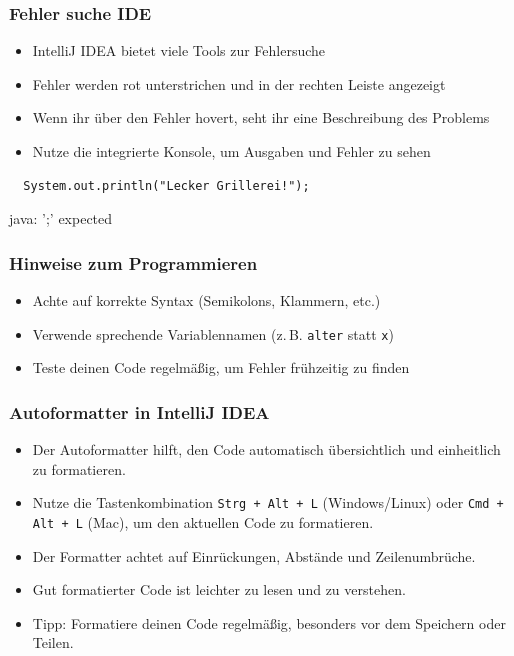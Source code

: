 \documentclass{../../presentation}
\begin{document}
\begin{frame}[fragile]
  \frametitle{Fehler suche IDE}
  \begin{itemize}
    \item IntelliJ IDEA bietet viele Tools zur Fehlersuche
    \item Fehler werden rot unterstrichen und in der rechten Leiste angezeigt
    \item Wenn ihr über den Fehler hovert, seht ihr eine Beschreibung des Problems
    \item Nutze die integrierte Konsole, um Ausgaben und Fehler zu sehen \newline
  \end{itemize}
  \begin{verbatim}
  System.out.println("Lecker Grillerei!");
  \end{verbatim}
  \begin{ausgabe}
    java: ';' expected
  \end{ausgabe}
\end{frame}

\begin{frame}[fragile]
  \frametitle{Hinweise zum Programmieren}
  \begin{itemize}
    \item Achte auf korrekte Syntax (Semikolons, Klammern, etc.)
    \item Verwende sprechende Variablennamen (z.\,B. \texttt{alter} statt \texttt{x})
    \item Teste deinen Code regelmäßig, um Fehler frühzeitig zu finden
  \end{itemize}
\end{frame}

\begin{frame}
  \frametitle{Autoformatter in IntelliJ IDEA}
  \begin{itemize}
    \item Der Autoformatter hilft, den Code automatisch übersichtlich und einheitlich zu formatieren.
    \item Nutze die Tastenkombination \texttt{Strg + Alt + L} (Windows/Linux) oder \texttt{Cmd + Alt + L} (Mac), um den aktuellen Code zu formatieren.
    \item Der Formatter achtet auf Einrückungen, Abstände und Zeilenumbrüche.
    \item Gut formatierter Code ist leichter zu lesen und zu verstehen.
    \item Tipp: Formatiere deinen Code regelmäßig, besonders vor dem Speichern oder Teilen.
  \end{itemize}
\end{frame}
\end{document}
